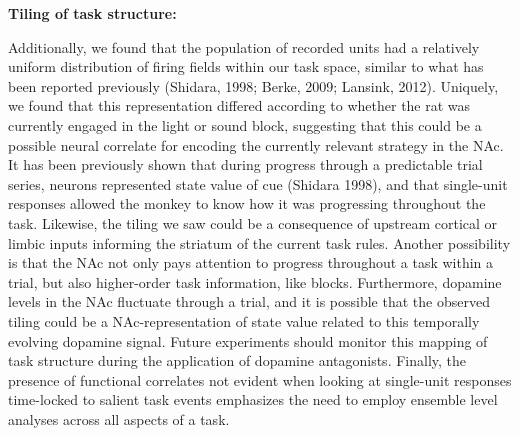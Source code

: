 \documentclass[11pt]{article}
\begin{document}
{\bf Tiling of task structure:}

Additionally, we found that the population of recorded units had a relatively uniform distribution of firing fields within our task space, similar to what has been reported previously (Shidara, 1998; Berke, 2009; Lansink, 2012). Uniquely, we found that this representation differed according to whether the rat was currently engaged in the light or sound block, suggesting that this could be a possible neural correlate for encoding the currently relevant strategy in the NAc. It has been previously shown that during progress through a predictable trial series, neurons represented state value of cue (Shidara 1998), and that single-unit responses allowed the monkey to know how it was progressing throughout the task. Likewise, the tiling we saw could be a consequence of upstream cortical or limbic inputs informing the striatum of the current task rules. Another possibility is that the NAc not only pays attention to progress throughout a task within a trial, but also higher-order task information, like blocks. Furthermore, dopamine levels in the NAc fluctuate through a trial, and it is possible that the observed tiling could be a NAc-representation of state value related to this temporally evolving dopamine signal. Future experiments should monitor this mapping of task structure during the application of dopamine antagonists. Finally, the presence of functional correlates not evident when looking at single-unit responses time-locked to salient task events emphasizes the need to employ ensemble level analyses across all aspects of a task.


\end{document}
